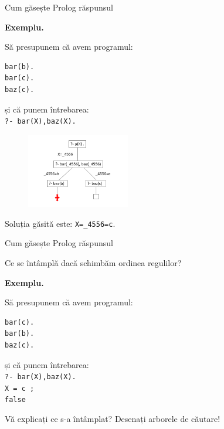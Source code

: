 \documentclass[xcolor=pdftex,romanian,colorlinks]{beamer}
\begin{document}
\begin{frame}[fragile]{Cum găsește Prolog răspunsul}


\textbf{\color{True} Exemplu.} 
\begin{multicols}{2}
Să presupunem că avem programul: 
\begin{verbatim}
bar(b). 
bar(c). 
baz(c).
\end{verbatim}
și că punem întrebarea: \\
{\color{blue}\texttt{?- bar(X),baz(X).}}
\columnbreak
\begin{figure}[h]
    \includegraphics[width=0.4\textwidth]{images/bar3}
\end{figure}
\end{multicols}

\medskip

Soluția găsită este: \texttt{X=\_4556=c}.
\end{frame}


\begin{frame}[fragile]{Cum găsește Prolog răspunsul}

\medskip
Ce se  întâmplă dacă schimbăm ordinea regulilor?

\textbf{\color{True} Exemplu.} 

Să presupunem că avem programul: 
\begin{verbatim}
bar(c). 
bar(b). 
baz(c).
\end{verbatim}
și că punem întrebarea: \\
{\color{blue}\texttt{?- bar(X),baz(X).}}\\
\pause
{\color{blue}\texttt{X = c ;}}\\
{\color{red}\texttt{false}}


\medskip

Vă explicați ce s-a întâmplat? Desenați arborele de căutare!

\end{frame}
\end{document}
